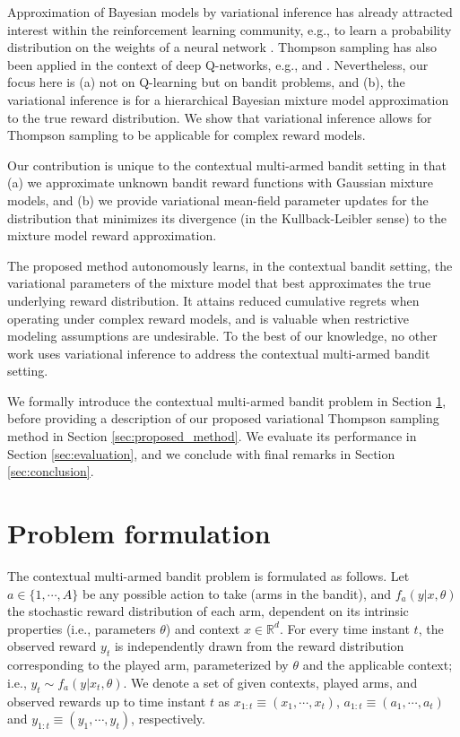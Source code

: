 \documentclass{article}
\def \Real{{\mathbb R}}
\newcommand{\ie}{i.e., }
\newcommand{\eg}{e.g., }
\begin{document}
Approximation of Bayesian models by variational inference has already attracted interest within the reinforcement learning community, \eg to learn a probability distribution on the weights of a neural network \cite{ip-Blundell2015}. Thompson sampling has also been applied in the context of deep Q-networks, \eg \cite{ip-Lipton2018} and \cite{ic-Osband2016}. Nevertheless, our focus here is (a) not on Q-learning but on bandit problems, and (b), the variational inference is for a hierarchical Bayesian mixture model approximation to the true reward distribution. We show that variational inference allows for Thompson sampling to be applicable for complex reward models.

Our contribution is unique to the contextual multi-armed bandit setting in that (a) we approximate unknown bandit reward functions with Gaussian mixture models, and (b) we provide variational mean-field parameter updates for the distribution that minimizes its divergence (in the Kullback-Leibler sense) to the mixture model reward approximation.

The proposed method autonomously learns, in the contextual bandit setting, the variational parameters of the mixture model that best approximates the true underlying reward distribution. It attains reduced cumulative regrets when operating under complex reward models, and is valuable when restrictive modeling assumptions are undesirable. To the best of our knowledge, no other work uses variational inference to address the contextual multi-armed bandit setting. 

\clearpage
We formally introduce the contextual multi-armed bandit problem in Section \ref{sec:problem_formulation}, before providing a description of our proposed variational Thompson sampling method in Section \ref{sec:proposed_method}. We evaluate its performance in Section \ref{sec:evaluation}, and we conclude with final remarks in Section \ref{sec:conclusion}.

\section{Problem formulation}
\label{sec:problem_formulation}

The contextual multi-armed bandit problem is formulated as follows. Let $a\in\{1,\cdots,A\}$ be any possible action to take (arms in the bandit), and $f_{a}(y|x,\theta)$ the stochastic reward distribution of each arm, dependent on its intrinsic properties (\ie parameters $\theta$) and context $x\in\Real^{d}$. For every time instant $t$, the observed reward $y_t$ is independently drawn from the reward distribution corresponding to the played arm, parameterized by $\theta$ and the applicable context; \ie $y_t\sim f_{a}(y|x_t,\theta)$. We denote a set of given contexts, played arms, and observed rewards up to time instant $t$ as $x_{1:t} \equiv (x_1, \cdots , x_t)$, $a_{1:t} \equiv (a_1, \cdots , a_t)$ and $y_{1:t} \equiv (y_1, \cdots , y_t)$, respectively.
\end{document}
